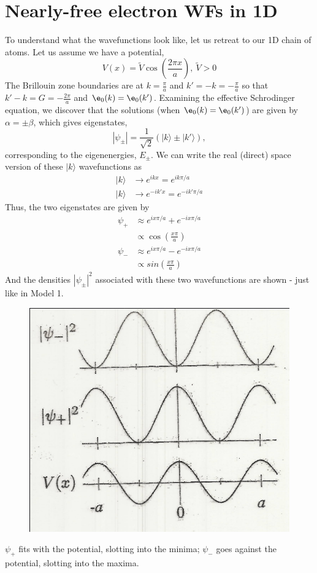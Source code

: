 \documentclass[a4paper, 11pt, normalem]{report}
\begin{document}
\section{Nearly-free electron WFs in 1D}
To understand what the wavefunctions look like, let us retreat to our 1D chain of atoms. 
Let us assume we have a potential, 
\begin{equation}
    V(x) = \tilde{V}\cos\left(\frac{2\pi x}{a}\right),~ \tilde{V} > 0
\end{equation}
The Brillouin zone boundaries are at $k = \frac{\pi}{a}$ and $k' = -k = -\frac{\pi}{a}$ so that $k' -k = G = -\frac{2\pi}{a}$ and $\e_0(k) = \e_0(k')$.
Examining the effective Schrodinger equation, we discover that the solutions (when $\e_0(k) = \e_0(k')$) are given by $\alpha = \pm \beta$, which gives eigenstates, 
\begin{equation}
    |\psi_{\pm}| = \frac{1}{\sqrt{2}}(|k\rangle \pm |k'\rangle),
\end{equation}
corresponding to the eigenenergies, $E_\pm$.
We can write the real (direct) space version of these $|k\rangle$ wavefunctions as 
\begin{align}
    |k\rangle &\to e^{ikx} = e^{ik\pi/a} \\
    |k\rangle &\to e^{-ik'x} = e^{-ik'\pi/a}
\end{align}
Thus, the two eigenstates are given by
\begin{align}
    \psi_+ &\approx e^{ix\pi/a} + e^{-ix\pi/a} \\
           &\propto \cos\left(\frac{x\pi}{a}\right) \\
    \psi_- &\approx e^{ix\pi/a} - e^{-ix\pi/a} \\
           &\propto sin\left(\frac{x\pi}{a}\right)
\end{align}
And the densities $|\psi_\pm|^2$ associated with these two wavefunctions are shown - just like in Model 1.
\begin{figure}[H]
    \centering
    \includegraphics[scale=0.7]{fform.png}
\end{figure}
$\psi_+$ fits with the potential, slotting into the minima; $\psi_-$ goes against the potential, slotting into the maxima.
\end{document}
